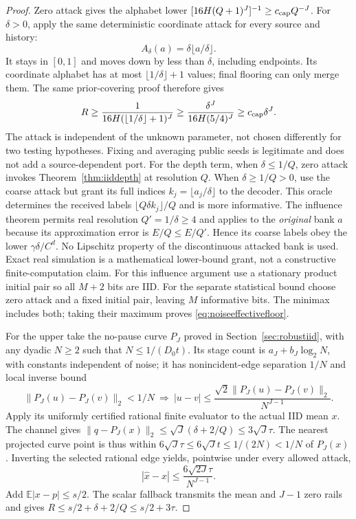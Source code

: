 \documentclass[11pt,letterpaper]{article}
\theoremstyle{definition}\newtheorem{definition}[theorem]{Definition}
\theoremstyle{remark}\newtheorem{remark}[theorem]{Remark}
\newcommand{\E}{\mathbb{E}}
\begin{document}
\begin{proof}
Zero attack gives the alphabet lower $[16H(Q+1)^J]^{-1}\ge c_{\rm cap}Q^{-J}$. For $\delta>0$, apply the same deterministic coordinate attack for every source and history:
\[
 A_\delta(a)=\delta\lfloor a/\delta\rfloor.
\]
It stays in $[0,1]$ and moves down by less than $\delta$, including endpoints. Its coordinate alphabet has at most $\lfloor1/\delta\rfloor+1$ values; final flooring can only merge them. The same prior-covering proof therefore gives
\[
 R\ge\frac1{16H(\lfloor1/\delta\rfloor+1)^J}
 \ge\frac{\delta^J}{16H(5/4)^J}\ge c_{\rm cap}\delta^J.
\]
The attack is independent of the unknown parameter, not chosen differently for two testing hypotheses. Fixing and averaging public seeds is legitimate and does not add a source-dependent port.
For the depth term, when $\delta\le1/Q$, zero attack invokes Theorem~\ref{thm:iiddepth} at resolution $Q$. When $\delta\ge1/Q>0$, use the coarse attack but grant its full indices $k_j=\lfloor a_j/\delta\rfloor$ to the decoder. This oracle determines the received labels $\lfloor Q\delta k_j\rfloor/Q$ and is more informative. The influence theorem permits real resolution $Q'=1/\delta\ge4$ and applies to the \emph{original} bank $a$ because its approximation error is $E/Q\le E/Q'$. Hence its coarse labels obey the lower $\gamma\delta/C^d$. No Lipschitz property of the discontinuous attacked bank is used. Exact real simulation is a mathematical lower-bound grant, not a constructive finite-computation claim. For this influence argument use a stationary product initial pair so all $M+2$ bits are IID. For the separate statistical bound choose zero attack and a fixed initial pair, leaving $M$ informative bits. The minimax includes both; taking their maximum proves \eqref{eq:noiseeffectivefloor}.

For the upper take the no-pause curve $P_J$ proved in Section~\ref{sec:robustiid}, with any dyadic $N\ge2$ such that $N\le1/(D_0t)$. Its stage count is $a_J+b_J\log_2N$, with constants independent of noise; it has nonincident-edge separation $1/N$ and local inverse bound
\[
 \|P_J(u)-P_J(v)\|_2<1/N
 \ \Longrightarrow\ 
 |u-v|\le\frac{\sqrt2\|P_J(u)-P_J(v)\|_2}{N^{J-1}}.
\]
Apply its uniformly certified rational finite evaluator to the actual IID mean $x$. The channel gives
$\|q-P_J(x)\|_2\le\sqrt J(\delta+2/Q)\le3\sqrt J\tau$.
The nearest projected curve point is thus within $6\sqrt J\tau\le6\sqrt Jt\le1/(2N)<1/N$ of $P_J(x)$. Inverting the selected rational edge yields, pointwise under every allowed attack,
\[
 |\widehat x-x|\le\frac{6\sqrt{2J}\tau}{N^{J-1}}.
\]
Add $\E|x-p|\le s/2$. The scalar fallback transmits the mean and $J-1$ zero rails and gives $R\le s/2+\delta+2/Q\le s/2+3\tau$.


\end{proof}
\end{document}
